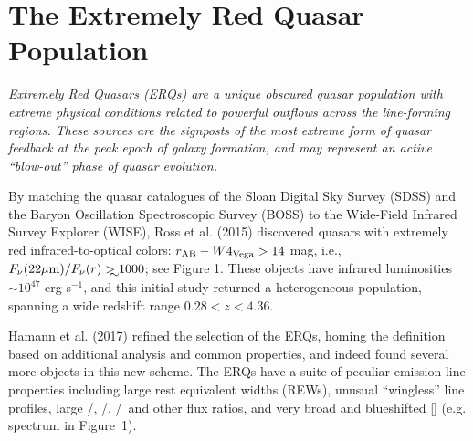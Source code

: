 \section*{The Extremely Red Quasar Population} 
{\it Extremely Red Quasars (ERQs) are a unique obscured quasar
population with extreme physical conditions related to powerful
outflows across the line-forming regions. These sources are the
signposts of the most extreme form of quasar feedback at the peak
epoch of galaxy formation, and may represent an active ``blow-out''
phase of quasar evolution.}

\smallskip
\smallskip
\noindent
By matching the quasar catalogues of the Sloan Digital Sky Survey
(SDSS) and the Baryon Oscillation Spectroscopic Survey (BOSS) to the
Wide-Field Infrared Survey Explorer (WISE), Ross et al. (2015)
discovered quasars with extremely red infrared-to-optical colors:
$r_{\rm AB}-W4_{\rm Vega}>14$ mag, i.e., $F_\nu({\rm 22\mu
m})/F_\nu(r) \gtrsim 1000$; see Figure 1. These objects have infrared
luminosities $\sim 10^{47}$ erg s$^{-1}$, and this initial study
returned a heterogeneous population, spanning a wide redshift
range $0.28 < z < 4.36$.

\smallskip
\smallskip
\noindent
Hamann et al. (2017) refined the selection of the ERQs, homing the
definition based on additional analysis and common properties, and
indeed found several more objects in this new scheme. The ERQs have a
suite of peculiar emission-line properties including large rest
equivalent widths (REWs), unusual ``wingless'' line profiles, large
\nv /\lya , \nv /\civ , \siiv /\civ\ and other flux ratios, and very
broad and blueshifted [\oiii ]  (e.g. spectrum in Figure~1).


